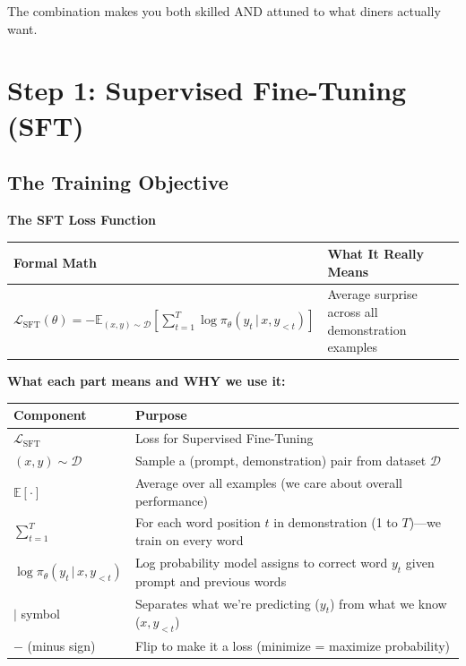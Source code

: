 \begin{chapterenv}
\begin{infobox}
The combination makes you both skilled AND attuned to what diners actually want.
\end{infobox}

\section{Step 1: Supervised Fine-Tuning (SFT)}

\subsection{The Training Objective}

\begin{infobox}
\textbf{The SFT Loss Function}

\begin{center}
\begin{tabular}{p{}p{}}
\toprule
\textbf{Formal Math} & \textbf{What It Really Means} \\
\midrule
$\mathcal{L}_{\text{SFT}}(\theta) = -\mathbb{E}_{(x,y) \sim \mathcal{D}}\!\left[\sum_{t=1}^T \log \pi_\theta(y_t \,|\, x, y_{<t})\right]$ & Average surprise across all demonstration examples \\
\bottomrule
\end{tabular}
\end{center}

\textbf{What each part means and WHY we use it:}

\begin{center}
\begin{tabular}{p{}p{}}
\toprule
\textbf{Component} & \textbf{Purpose} \\
\midrule
$\mathcal{L}_{\text{SFT}}$ & Loss for Supervised Fine-Tuning \\
$(x, y) \sim \mathcal{D}$ & Sample a (prompt, demonstration) pair from dataset $\mathcal{D}$ \\
$\mathbb{E}[\cdot]$ & Average over all examples (we care about overall performance) \\
$\sum_{t=1}^T$ & For each word position $t$ in demonstration (1 to $T$)---we train on every word \\
$\log \pi_\theta(y_t \,|\, x, y_{<t})$ & Log probability model assigns to correct word $y_t$ given prompt and previous words \\
$|$ symbol & Separates what we're predicting ($y_t$) from what we know ($x, y_{<t}$) \\
$-$ (minus sign) & Flip to make it a loss (minimize = maximize probability) \\
\bottomrule
\end{tabular}
\end{center}
\end{infobox}


\end{chapterenv}
